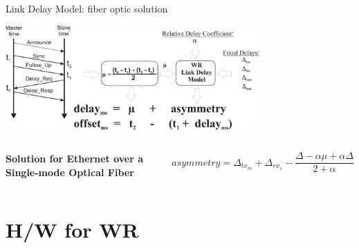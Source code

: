 \documentclass[compress,red]{beamer}
\begin{document}
\begin{frame}{Link Delay Model: fiber optic solution}

  \begin{center}
  \includegraphics[height=4cm]{protocol/wrLinkModel.pdf}
  \end{center}

  \begin{columns}[c]
  \column{1.5in}

    \begin{center}
      \textbf{Solution for Ethernet over a Single-mode Optical Fiber}
    \end{center}    

  \column{2.7in}

    \begin{equation}
      \nonumber asymmetry = \Delta_{tx_m} + \Delta_{rx_s} - \frac{\Delta - \alpha \mu + \alpha \Delta}{2 + \alpha}
    \end{equation}

  \end{columns}

\end{frame}
% 
% 
\section{H/W for WR}
\end{document}
